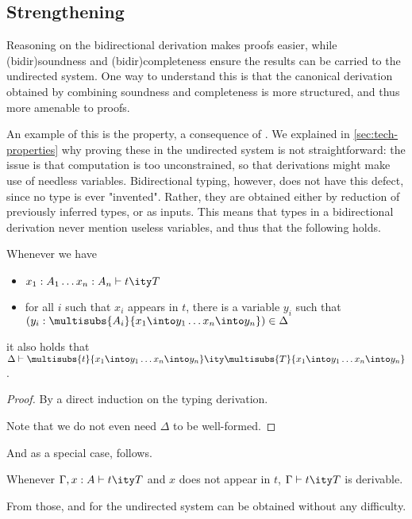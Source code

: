 \subsection{Strengthening}

Reasoning on the bidirectional derivation makes proofs easier,
while \kl(bidir){soundness} and \kl(bidir){completeness} ensure the results
can be carried to the undirected system.
One way to understand this is that the canonical derivation obtained by combining
soundness and completeness is more structured, and thus more amenable to proofs.

An example of this is the  property, a consequence of
. We explained in \cref{sec:tech-properties}
why proving these in the undirected system is not straightforward: the issue is that 
computation is too unconstrained, so that derivations might make use of needless variables.
Bidirectional typing, however, does not have this defect, since no type is ever "invented".
Rather, they are obtained either by reduction of previously inferred types, or as inputs.
This means that types in a bidirectional derivation never mention useless variables, and thus
that the following holds.

\begin{minipage}{\textwidth}
\begin{theorem}
  \label{thm:strong-stab-renaming-bidir}
  Whenever we have 
  \begin{itemize}
    \item $\inferty{x_1 : A_1 \dots x_n : A_n}{t}{T}$
    \item for all $i$ such that $x_i$ appears in $t$,
      there is a variable $y_i$ such that $(y_i : \multisubs{A_i}{x_1 \into y_1 \dots x_n \into y_n}) \in \Delta$
  \end{itemize} 
  it also holds that $\inferty{\Delta}{\multisubs{t}{x_1 \into y_1 \dots x_n \into y_n}}{\multisubs{T}{x_1 \into y_1 \dots x_n \into y_n}}$.
\end{theorem}
\end{minipage}

\begin{proof}
  By a direct induction on the typing derivation.

  Note that we do not even need $\Delta$ to be well-formed.
\end{proof}

And as a special case,  follows.

\begin{theorem}
  \label{thm:strengthening-bidir}
  Whenever $\inferty{\Gamma, x : A}{t}{T}$ and $x$ does not appear in $t$,
  $\inferty{\Gamma}{t}{T}$ is derivable.
\end{theorem}

From those,  and  for
the undirected system can be obtained without any difficulty.